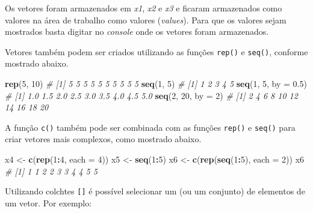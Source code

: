 \documentclass[
]{book}
\makeatletter
\newenvironment{Shaded}{\begin{snugshade}}{\end{snugshade}}
\newcommand{\CommentTok}[1]{\textcolor[rgb]{0.56,0.35,0.01}{\textit{#1}}}
\newcommand{\DataTypeTok}[1]{\textcolor[rgb]{0.13,0.29,0.53}{#1}}
\newcommand{\DecValTok}[1]{\textcolor[rgb]{0.00,0.00,0.81}{#1}}
\newcommand{\FloatTok}[1]{\textcolor[rgb]{0.00,0.00,0.81}{#1}}
\newcommand{\KeywordTok}[1]{\textcolor[rgb]{0.13,0.29,0.53}{\textbf{#1}}}
\newcommand{\NormalTok}[1]{#1}
\newcommand{\OperatorTok}[1]{\textcolor[rgb]{0.81,0.36,0.00}{\textbf{#1}}}
\newcommand{\StringTok}[1]{\textcolor[rgb]{0.31,0.60,0.02}{#1}}
\numberwithin{equation}{section}
\newcommand{\indf}[1]{\index[function]{#1@\texttt{#1()}|ST}}
\makeatother
\begin{document}
Os vetores foram armazenados em \emph{x1}, \emph{x2} e \emph{x3} e ficaram armazenados como valores na área de trabalho como valores (\emph{values}). Para que os valores sejam mostrados basta digitar no \emph{console} onde os vetores foram armazenados.

Vetores também podem ser criados utilizando as funções \texttt{rep()} e \texttt{seq()}, conforme mostrado abaixo. \indf{rep} \indf{seq}

\begin{Shaded}
\begin{Highlighting}[]
\KeywordTok{rep}\NormalTok{(}\DecValTok{5}\NormalTok{, }\DecValTok{10}\NormalTok{)}
\CommentTok{\#  [1] 5 5 5 5 5 5 5 5 5 5}
\KeywordTok{seq}\NormalTok{(}\DecValTok{1}\NormalTok{, }\DecValTok{5}\NormalTok{)}
\CommentTok{\# [1] 1 2 3 4 5}
\KeywordTok{seq}\NormalTok{(}\DecValTok{1}\NormalTok{, }\DecValTok{5}\NormalTok{, }\DataTypeTok{by =} \FloatTok{0.5}\NormalTok{)}
\CommentTok{\# [1] 1.0 1.5 2.0 2.5 3.0 3.5 4.0 4.5 5.0}
\KeywordTok{seq}\NormalTok{(}\DecValTok{2}\NormalTok{, }\DecValTok{20}\NormalTok{, }\DataTypeTok{by =} \DecValTok{2}\NormalTok{)}
\CommentTok{\#  [1]  2  4  6  8 10 12 14 16 18 20}
\end{Highlighting}
\end{Shaded}

A função \texttt{c()} também pode ser combinada com as funções \texttt{rep()} e \texttt{seq()} para criar vetores mais complexos, como mostrado abaixo.

\begin{Shaded}
\begin{Highlighting}[]
\NormalTok{x4 \textless{}{-}}\StringTok{ }\KeywordTok{c}\NormalTok{(}\KeywordTok{rep}\NormalTok{(}\DecValTok{1}\OperatorTok{:}\DecValTok{4}\NormalTok{, }\DataTypeTok{each =} \DecValTok{4}\NormalTok{))}
\NormalTok{x5 \textless{}{-}}\StringTok{ }\KeywordTok{seq}\NormalTok{(}\DecValTok{1}\OperatorTok{:}\DecValTok{5}\NormalTok{)}
\NormalTok{x6 \textless{}{-}}\StringTok{ }\KeywordTok{c}\NormalTok{(}\KeywordTok{rep}\NormalTok{(}\KeywordTok{seq}\NormalTok{(}\DecValTok{1}\OperatorTok{:}\DecValTok{5}\NormalTok{), }\DataTypeTok{each =} \DecValTok{2}\NormalTok{))}
\NormalTok{x6}
\CommentTok{\#  [1] 1 1 2 2 3 3 4 4 5 5}
\end{Highlighting}
\end{Shaded}

Utilizando colchtes \texttt{{[}{]}} é possível selecionar um (ou um conjunto) de elementos de um vetor. Por exemplo:
\end{document}
